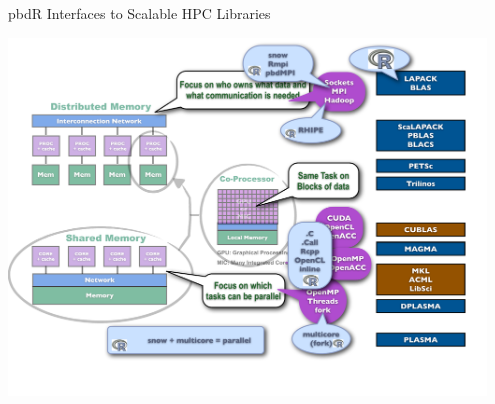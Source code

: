 \begin{frame}
\begin{block}{pbdR Interfaces to Scalable HPC Libraries}
    
\includegraphics[width=0.95\textwidth]
{../common/pics/hardware/ParallelHardware11.pdf}
\end{block}
\end{frame}